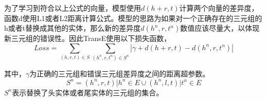 为了学习到符合以上公式的向量，模型使用$d(h+r, t)$计算两个向量的差异度，函数d使用L1或者L2距离计算公式。模型的思路为如果对一个正确存在的三元组的h或者t替换成其他的实体，那么新的差异度$d(h^n,r,t^n)$数值应该尽量大，以体现新三元组的错误性。因此TransE使用以下损失函数，
\begin{equation}
Loss = \sum_{(h,r,t) \in S}\sum_{(h^n,r,t^n)\in S^n}|\gamma+d(h+r, t)-d(h^n,r,t^n)|
\end{equation}

其中，$\gamma$为正确的三元组和错误三元组差异度之间的距离超参数。
\begin{equation}
S^n = {(h^n,r,t)|h^n \in E} \cup {(h^n,l,t)|t^n \in E}
\end{equation}
$S^n$表示替换了头实体或者尾实体的三元组的集合。



